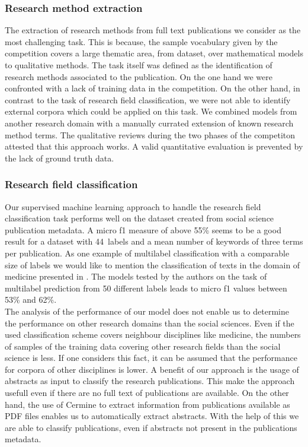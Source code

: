 \subsubsection{Research method extraction}
The extraction of research methods from full text publications we consider as the most challenging task.
This is because, the sample vocabulary given by the competition covers a large thematic area, from dataset, over mathematical models to qualitative methods.
The task itself was defined as the identification of research methods associated to the publication.
On the one hand we were confronted with a lack of training data in the competition.
On the other hand, in contrast to the task of research field classification, we were not able to identify external corpora which could be applied on this task.
We combined models from another research domain with a manually currated extension of known research method terms.
The qualitative reviews during the two phases of the competiton attested that this approach works.
A valid quantitative evaluation is prevented by the lack of ground truth data.

\subsubsection{Research field classification}
Our supervised machine learning approach to handle the research field classification task performs well on the dataset created from social science publication metadata.
A micro f1 measure of above 55\% seems to be a good result for a dataset with 44~labels and a mean number of keywords of three terms per publication.
As one example of multilabel classification with a comparable size of labels we would like to mention the classification of texts in the domain of medicine presented in \cite{wang2018joint}.
The models tested by the authors on the task of multilabel prediction from 50 different labels leads to micro f1 values between 53\% and 62\%.\\
The analysis of the performance of our model does not enable us to determine the performance on other research domains than the social sciences.
Even if the used classification scheme covers neighbour disciplines like medicine, the numbers of samples of the training data covering other research fields than the social science is less.
If one considers this fact, it can be assumed that the performance for corpora of other disciplines is lower.
A benefit of our approach is the usage of abstracts as input to classify the research publications.
This make the approach usefull even if there are no full text of publications are available.
On the other hand, the use of Cermine to extract information from publications available as PDF files enables us to automatically extract abstracts.
With the help of this we are able to classify publications, even if abstracts not present in the publications metadata.


